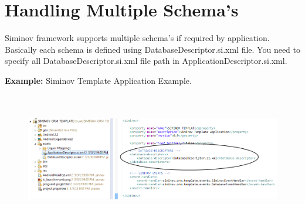 \newpage
\section{Handling Multiple Schema's}
Siminov framework supports multiple schema's if required by application. Basically each schema is defined using DatabaseDescriptor.si.xml file. You need to specify all DatabaseDescriptor.si.xml file path in ApplicationDescriptor.si.xml.

		\par
		\textbf{Example:} Siminov Template Application Example.
		\begin{figure}[htbp]
			\centering
				\includegraphics[height=5.8cm]{Resources/siminov_application_multiple_schemas_example.png}
		\end{figure}



